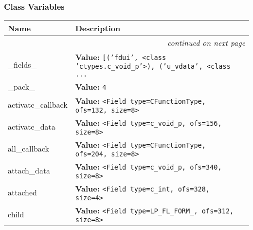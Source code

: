 
  \subsubsection{Class Variables}

    \vspace{-1cm}
\hspace{\varindent}\begin{longtable}{|p{\varnamewidth}|p{\vardescrwidth}|l}
\cline{1-2}
\cline{1-2} \centering \textbf{Name} & \centering \textbf{Description}& \\
\cline{1-2}
\endhead\cline{1-2}\multicolumn{3}{r}{\small\textit{continued on next page}}\\\endfoot\cline{1-2}
\endlastfoot\raggedright \_\-f\-i\-e\-l\-d\-s\-\_\- & \raggedright \textbf{Value:} 
{\tt \texttt{[}\texttt{(}\texttt{'}\texttt{fdui}\texttt{'}\texttt{, }{\textless}class 'ctypes.c\_void\_p'{\textgreater}\texttt{)}\texttt{, }\texttt{(}\texttt{'}\texttt{u\_vdata}\texttt{'}\texttt{, }{\textless}class \texttt{...}}&\\
\cline{1-2}
\raggedright \_\-p\-a\-c\-k\-\_\- & \raggedright \textbf{Value:} 
{\tt 4}&\\
\cline{1-2}
\raggedright a\-c\-t\-i\-v\-a\-t\-e\-\_\-c\-a\-l\-l\-b\-a\-c\-k\- & \raggedright \textbf{Value:} 
{\tt {\textless}Field type=CFunctionType, ofs=132, size=8{\textgreater}}&\\
\cline{1-2}
\raggedright a\-c\-t\-i\-v\-a\-t\-e\-\_\-d\-a\-t\-a\- & \raggedright \textbf{Value:} 
{\tt {\textless}Field type=c\_void\_p, ofs=156, size=8{\textgreater}}&\\
\cline{1-2}
\raggedright a\-l\-l\-\_\-c\-a\-l\-l\-b\-a\-c\-k\- & \raggedright \textbf{Value:} 
{\tt {\textless}Field type=CFunctionType, ofs=204, size=8{\textgreater}}&\\
\cline{1-2}
\raggedright a\-t\-t\-a\-c\-h\-\_\-d\-a\-t\-a\- & \raggedright \textbf{Value:} 
{\tt {\textless}Field type=c\_void\_p, ofs=340, size=8{\textgreater}}&\\
\cline{1-2}
\raggedright a\-t\-t\-a\-c\-h\-e\-d\- & \raggedright \textbf{Value:} 
{\tt {\textless}Field type=c\_int, ofs=328, size=4{\textgreater}}&\\
\cline{1-2}
\raggedright c\-h\-i\-l\-d\- & \raggedright \textbf{Value:} 
{\tt {\textless}Field type=LP\_FL\_FORM\_, ofs=312, size=8{\textgreater}}&\\

\end{longtable}
